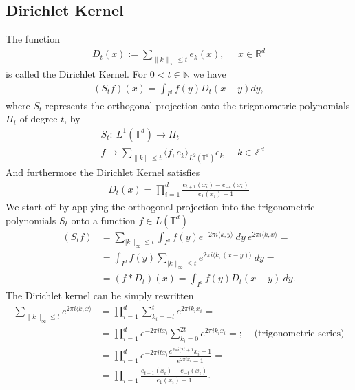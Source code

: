 \documentclass[a4paper]{article}
\begin{document}
\subsection{Dirichlet Kernel}
The function
\begin{align}
    D_t(x) := \sum_{\lVert k \rVert_\infty \leq t} e_k(x), \;\;\;\;\; x\in
    \mathbb{R}^d
\end{align}
is called the Dirichlet Kernel. For $0 < t \in \mathbb{N}$ we have
\begin{align}
    (S_tf)(x) = \int_{I^d} f(y) D_t(x-y) dy,
\end{align}
where $S_t$ represents the orthogonal projection onto the trigonometric
polynomials $\Pi_t$ of degree $t$, by
\begin{align}
    &S_t:\ L^1(\mathbb{T}^d) \rightarrow \Pi_t \\
    &f \mapsto \sum_{\lVert k \rVert \leq t} \langle f,
    e_k\rangle_{L^2(\mathbb{T}^d)} e_k \;\;\;\;\; k \in \mathbb{Z}^d
\end{align}
And furthermore the Dirichlet Kernel satisfies
\begin{align}
    D_t(x) = \prod_{i=1}^d \frac{e_{t+1}(x_i) - e_{-t}(x_i)}{e_1(x_i) - 1}
\end{align}
We start off by applying the orthogonal projection into the trigonometric
polynomials $S_t$ onto a function $f \in L(\mathbb{T}^d)$
\begin{align}
    (S_tf) &= \sum_{\lvert k\rVert_\infty \leq t} \int_{I^d} f(y) e^{-2\pi i
    \langle k, y\rangle}\ dy\ e^{2\pi i\langle k, x\rangle} =\\
    &= \int_{I^d}f(y) \sum_{\lvert k\rVert_\infty \leq t} e^{2\pi i \langle
    k, (x- y)\rangle}\ dy =\\
    &= (f * D_t) (x) = \int_{I^d} f(y) D_t(x - y)\ dy.
\end{align}
The Dirichlet kernel can be simply rewritten
\begin{align}
    \sum_{\lVert k \rVert_\infty \leq t} e^{2\pi i \langle k , x\rangle} &=
    \prod_{i=1}^d \sum_{k_i = -t}^t e^{2\pi i k_i x_i} =\\
    &= \prod_{i=1}^d e^{-2\pi i t x_i} \sum_{k_i = 0}^{2t} e^{2\pi i k_i
        x_i}=;\;\;\;\; \text{(trigonometric series)}\\
    &= \prod_{i=1}^d e^{-2\pi i t x_i} \frac{e^{2\pi i (2t +1}x_i -
    1}{e^{2\pi i x_i} - 1} =\\
    &= \prod_{i = 1} \frac{e_{t+1}(x_i) - e_{-t}(x_i)}{e_1(x_i) - 1}.
\end{align}
\end{document}
